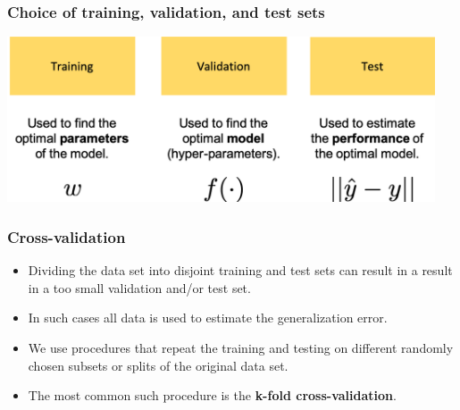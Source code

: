\documentclass[notes]{beamer}          %
\newif\iffull
\begin{document}
\iffull
\begin{frame}
\frametitle{Choice of training, validation, and test sets}
    \begin{itemize}
        \item Since the validation set is used to determine the hyperparameters it will typically underestimate the generalization error.
        \item However, it will usually better predict the generalization error than the training set.
        \item After the completion of the hyperparameters optimization we can estimate the generalization error using the test data.
        \item In practice the testing should be done also on different test data to avoid the test data becoming ``stale''.
    \end{itemize}
\end{frame}
\fi

\begin{frame}
\frametitle{Choice of training, validation, and test sets}
    \begin{center}
        \includegraphics[width=0.95\textwidth]{../figures/week_1/subsets.png}
    \end{center}
\end{frame}

\iffull
\begin{frame}
\frametitle{Discussion point 4}
How large should the training, validation and testing datasets be as a percentage (\%) of the total available data?
\end{frame}
\fi

\begin{frame}
\frametitle{Cross-validation}
    \begin{itemize}
        \item Dividing the data set into disjoint training and test sets can result in a result in a too small validation and/or test set.
        \item In such cases all data is used to estimate the generalization error.
        \item We use procedures that repeat the training and testing on different randomly chosen subsets or splits of the original data set.
        \item The most common such procedure is the {\bf k-fold cross-validation}.
    \end{itemize}
\end{frame}
\end{document}
